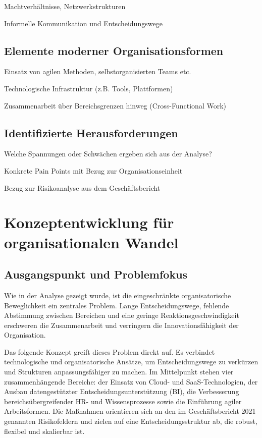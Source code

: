 \documentclass[12pt,a4paper]{article}
\begin{document}
	Machtverhältnisse, Netzwerkstrukturen
	
	Informelle Kommunikation und Entscheidungswege
	\subsection{Elemente moderner Organisationsformen}
	Einsatz von agilen Methoden, selbstorganisierten Teams etc.
	
	Technologische Infrastruktur (z.B. Tools, Plattformen)
	
	Zusammenarbeit über Bereichsgrenzen hinweg (Cross-Functional Work)
	\subsection{Identifizierte Herausforderungen}
	
	Welche Spannungen oder Schwächen ergeben sich aus der Analyse?
	
	Konkrete Pain Points mit Bezug zur Organisationseinheit
	
	Bezug zur Risikoanalyse aus dem Geschäftsbericht
	
	\section{Konzeptentwicklung für organisationalen Wandel}
	
	\subsection{Ausgangspunkt und Problemfokus}
	
	Wie in der Analyse gezeigt wurde, ist die eingeschränkte organisatorische Beweglichkeit ein zentrales Problem. Lange Entscheidungswege, fehlende Abstimmung zwischen Bereichen und eine geringe Reaktionsgeschwindigkeit erschweren die Zusammenarbeit und verringern die Innovationsfähigkeit der Organisation.
	
	\noindent Das folgende Konzept greift dieses Problem direkt auf. Es verbindet technologische und organisatorische Ansätze, um Entscheidungswege zu verkürzen und Strukturen anpassungsfähiger zu machen. Im Mittelpunkt stehen vier zusammenhängende Bereiche: der Einsatz von Cloud- und SaaS-Technologien, der Ausbau datengestützter Entscheidungsunterstützung (BI), die Verbesserung bereichsübergreifender HR- und Wissensprozesse sowie die Einführung agiler Arbeitsformen. Die Maßnahmen orientieren sich an den im Geschäftsbericht 2021 genannten Risikofeldern und zielen auf eine Entscheidungsstruktur ab, die robust, flexibel und skalierbar ist.
	
\end{document}
